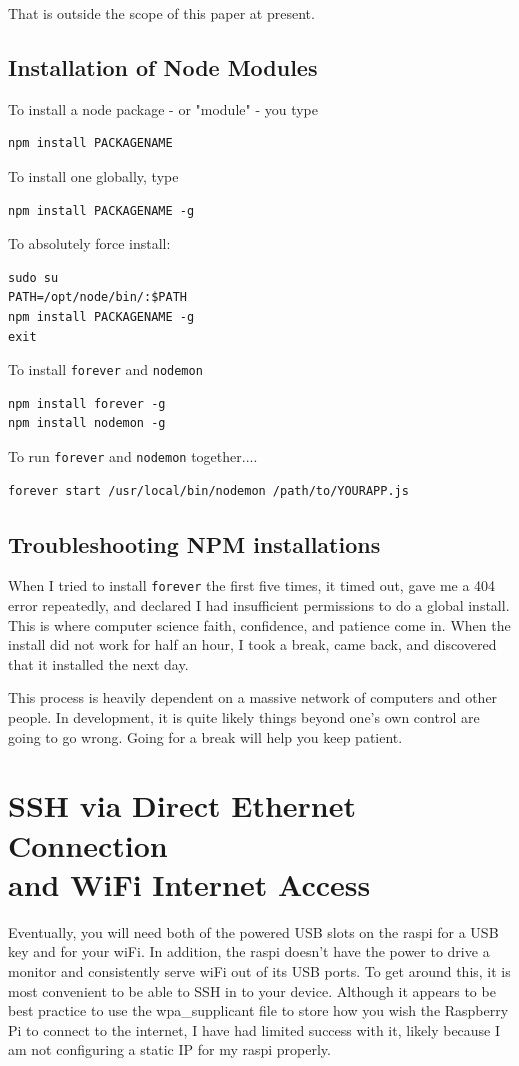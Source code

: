 That is outside the scope of this paper at present. 

\subsection{Installation of Node Modules}
To install a node package - or "module" - you type 

\begin{lstlisting}
npm install PACKAGENAME
\end{lstlisting}

To install one globally, type
\begin{lstlisting}
npm install PACKAGENAME -g
\end{lstlisting}


To absolutely force install:
\begin{lstlisting}
sudo su
PATH=/opt/node/bin/:$PATH
npm install PACKAGENAME -g
exit
\end{lstlisting}

To install \texttt{forever} and \texttt{nodemon}
\begin{lstlisting}
npm install forever -g
npm install nodemon -g
\end{lstlisting}

To run \texttt{forever} and \texttt{nodemon} together....
\begin{lstlisting}
forever start /usr/local/bin/nodemon /path/to/YOURAPP.js
\end{lstlisting}

\subsection{Troubleshooting NPM installations}
When I tried to install \texttt{forever} the first five times, it timed out, gave me a 404 error repeatedly, and declared I had insufficient permissions to do a global install. This is where computer science faith, confidence, and patience come in. When the install did not work for half an hour, I took a break, came back, and discovered that it installed the next day.

This process is heavily dependent on a massive network of computers and other people. In development, it is quite likely things beyond one's own control are going to go wrong. Going for a break will help you keep patient.

\section{SSH via Direct Ethernet Connection\\ and WiFi Internet Access}
Eventually, you will need both of the powered USB slots on the raspi for a USB key and for your wiFi. In addition, the raspi doesn't have the power to drive a monitor and consistently serve wiFi out of its USB ports. To get around this, it is most convenient to be able to SSH in to your device. Although it appears to be best practice to use the wpa_supplicant file to store how you wish the Raspberry Pi to connect to the internet, I have had limited success with it, likely because I am not configuring a static IP for my raspi properly.

